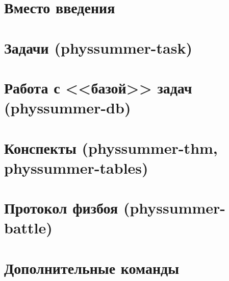 

\teachermode



\section*{Вместо введения}










\section{Задачи (physsummer-task)}



\section{Работа с <<базой>> задач (physsummer-db)}



\section{Конспекты (physsummer-thm, physsummer-tables)}



\section{Протокол физбоя (physsummer-battle)}






\section{Дополнительные команды}





